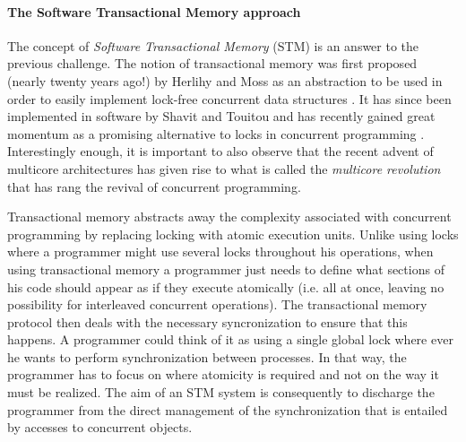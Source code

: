 \paragraph{The Software Transactional Memory approach}
The concept of {\it Software Transactional  Memory}   (STM)  is  an answer  
to   the  previous  challenge.   The notion  of   transactional  memory  was
first   proposed  (nearly twenty years ago!) by Herlihy  and Moss 
as an abstraction to be used in order to easily 
implement lock-free concurrent  data structures  \cite{HM93}.  It  has  since  been 
implemented in software  by Shavit  and  Touitou   \cite{ST97} and  has
recently gained great  momentum as  a promising alternative  to locks in
concurrent programming  \cite{FFGH08,H07,LK08,R08}. Interestingly  enough,  
it is important to also observe that the recent advent of multicore 
architectures has  given rise to what is called the {\it multicore  
revolution} \cite{HL08} that has  rang the revival of concurrent programming. 


Transactional  memory   abstracts away the  complexity associated with 
concurrent programming    by  replacing locking  with  atomic
execution units.
Unlike using locks where a programmer might use several locks
throughout his operations, when using transactional memory
a programmer just needs to define what sections of his code should
appear as if they execute atomically (i.e. all at once, leaving
no possibility for interleaved concurrent operations).
The transactional memory protocol then deals with the necessary
syncronization to ensure that this happens.
A programmer could think of it as using a single global lock
where ever he wants to perform synchronization between processes.
In  that way, the programmer has to focus on  where 
atomicity is required and  not on the  way it must be realized. The aim of
an STM system is consequently  to  discharge the programmer from the direct 
management  of  the  synchronization  that  is entailed  by   accesses   to
concurrent  objects.  



